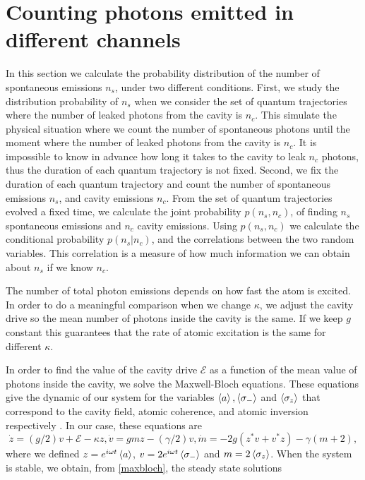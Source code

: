 \documentclass[%
 reprint,
 amsmath,amssymb,
 aps, 
]{revtex4-1}
\begin{document}
\section{Counting photons emitted in different channels}\label{sc:distributions}
In this section we calculate the probability distribution of the
number of spontaneous emissions $n_s$, under two different conditions.
First, we study the distribution probability of $n_s$ when we consider
the set of quantum trajectories where the number of leaked photons
from the cavity is $n_c$. This simulate the physical situation where
we count the number of spontaneous photons until the moment where the
number of leaked photons from the cavity is $n_c$. It is impossible to
know in advance how long it takes to the cavity to leak $n_c$ photons,
thus the duration of each quantum trajectory is not fixed. Second, we
fix the duration of each quantum trajectory and count the number of
spontaneous emissions $n_s$, and cavity emissions $n_c$. From the set
of quantum trajectories evolved a fixed time, we calculate the joint
probability $p(n_s,n_c)$, of finding $n_s$ spontaneous emissions and
$n_c$ cavity emissions. Using $p(n_s,n_c)$ we calculate the
conditional probability $p(n_s|n_c)$, and the correlations between the
two random variables. This correlation is a measure of how much
information we can obtain about $n_s$ if we know $n_c$.

The number of total photon emissions depends on how fast the atom is
excited. In order to do a meaningful comparison when we change
$\kappa$, we adjust the cavity drive so the mean number of photons
inside the cavity is the same. If we keep $g$ constant this guarantees
that the rate of atomic excitation is the same for different $\kappa$.

In order to find the value of the cavity drive $\mathcal{E}$ as a
function of the mean value of photons inside the cavity, we solve the
Maxwell-Bloch equations. These equations give the dynamic of our
system for the variables $\expval{a}, \expval{\sigma_-}$ and
$\expval{\sigma_z}$ that correspond to the cavity field, atomic
coherence, and atomic inversion respectively \cite{Alsing_1991}. In
our case, these equations are
\begin{subequations} \label{maxbloch}
\begin{equation} \label{bloch1}
\dot{z} = (g/2)v + \mathcal{E} - \kappa z,
\end{equation}
\begin{equation} \label{bloch2}
\dot{v} = gmz - (\gamma/2)v,
\end{equation}
\begin{equation} \label{bloch3}
\dot{m} = -2g(z^*v + v^*z) - \gamma(m + 2),
\end{equation}
\end{subequations} 
where we defined $z = e^{i\omega t}\expval{a}$,
$v = 2e^{i\omega t}\expval{\sigma_-}$ and $m = 2\expval{\sigma_z}$.
When the system is stable, we obtain, from
\eqref{maxbloch}, the steady state
solutions \cite{gagniuc2017markov}
\end{document}
